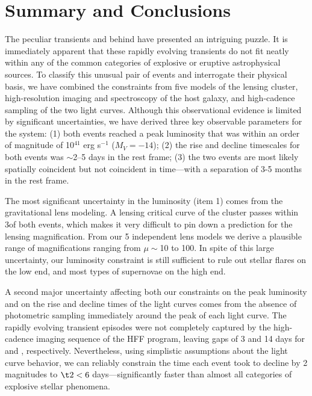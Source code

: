 \section{Summary and Conclusions}
\label{sec:Conclusions}

The peculiar transients \spockone and \spocktwo behind  have
presented an intriguing puzzle.  It is immediately apparent that these
rapidly evolving transients do not fit neatly within any of the common
categories of explosive or eruptive astrophysical sources. To classify
this unusual pair of events and interrogate their physical basis, we
have combined the constraints from five models of the lensing cluster,
high-resolution imaging and spectroscopy of the host galaxy, and
high-cadence \HST sampling of the two light curves.  Although this
observational evidence is limited by significant uncertainties, we
have derived three key observable parameters for the \spock system:
(1) both events reached a peak luminosity that was within an order of
magnitude of 10$^{41}$ erg s$^{-1}$ ($M_V=-14$); (2) the rise and
decline timescales for both events was $\sim$2--5 days in the rest
frame; (3) the two events are most likely spatially coincident but not
coincident in time---with a separation of 3-5 months in the rest frame.

The most significant uncertainty in the luminosity (item 1) comes from
the gravitational lens modeling.  A lensing critical curve of the
 cluster passes within 3\arcsec of both \spock events, which
makes it very difficult to pin down a prediction for the lensing
magnification.  From our 5 independent lens models we derive a
plausible range of magnifications ranging from $\mu\sim$10 to 100. In
spite of this large uncertainty, our luminosity constraint is still
sufficient to rule out stellar flares on the low end, and most types
of supernovae on the high end.

A second major uncertainty affecting both our constraints on the peak
luminosity and on the rise and decline times of the light curves comes
from the absence of photometric sampling immediately around the peak
of each light curve.  The rapidly evolving transient episodes were not
completely captured by the high-cadence imaging sequence of the HFF
program, leaving gaps of 3 and 14 days for \spockone and \spocktwo,
respectively.  Nevertheless, using simplistic assumptions about the
light curve behavior, we can reliably constrain the time each event
took to decline by 2 magnitudes to $\t2<6$ days---significantly
faster than almost all categories of explosive stellar phenomena.

